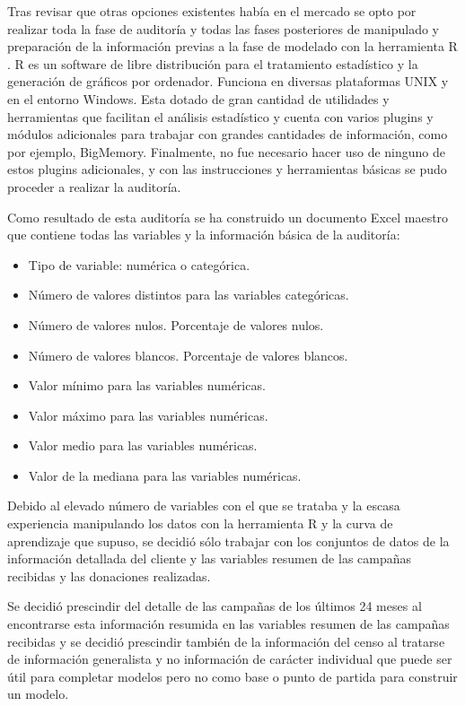 Tras revisar que otras opciones existentes había en el mercado se opto por realizar toda la fase de auditoría y todas las fases posteriores de manipulado y preparación de la información previas a la fase de modelado con la herramienta R \cite{R}. R es un software de libre distribución para el tratamiento estadístico y la generación de gráficos por ordenador. Funciona en diversas plataformas UNIX y en el entorno Windows. Esta dotado de gran cantidad de utilidades y herramientas que facilitan el análisis estadístico y cuenta con varios plugins y módulos adicionales para trabajar con grandes cantidades de información, como por ejemplo, BigMemory.
Finalmente, no fue necesario hacer uso de ninguno de estos plugins adicionales, y con las instrucciones y herramientas básicas se pudo proceder a realizar la auditoría.

Como resultado de esta auditoría se ha construido un documento Excel maestro que contiene todas las variables y la información básica de la auditoría: 

\begin{itemize}

\item{Tipo de variable: numérica o categórica.}
\item{Número de valores distintos para las variables categóricas.}
\item{Número de valores nulos. Porcentaje de valores nulos.}
\item{Número de valores blancos. Porcentaje de valores blancos.}
\item{Valor mínimo para las variables numéricas.}
\item{Valor máximo para las variables numéricas.}
\item{Valor medio para las variables numéricas.}
\item{Valor de la mediana para las variables numéricas.}

\end{itemize}

Debido al elevado número de variables con el que se trataba y la escasa experiencia manipulando los datos con la herramienta R y la curva de aprendizaje que supuso, se decidió sólo trabajar con los conjuntos de datos de la información detallada del cliente y las variables resumen de las campañas recibidas y las donaciones realizadas.

Se decidió prescindir del detalle de las campañas de los últimos 24 meses al encontrarse esta información resumida en las variables resumen de las campañas recibidas y se decidió prescindir también de la información del censo al tratarse de información generalista y no información de carácter individual que puede ser útil para completar modelos pero no como base o punto de partida para construir un modelo.

